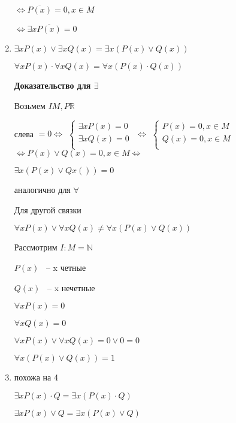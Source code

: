 \documentclass[russian]{lecture-notes}
\begin{document}
\begin{enumerate}
{	$\Leftrightarrow \overline{P(x)} = 0, x \in M$
	
	$\Leftrightarrow \exists x \overline{P(x)} = 0$
}

\item{
	$\exists x P(x) \lor \exists x Q(x) = \exists x (P(x) \lor Q(x))$
	
	$\forall x P(x) \cdot \forall x Q(x) = \forall x (P(x) \cdot Q(x))$
	
	\textbf{Доказательство для $\exists$}
	
	Возьмем $I M, P \mathbb{R}$
	
		
	
	слева $ = 0 \Leftrightarrow$
	$\left \{ 
  		\begin{gathered} 
    			\exists x P(x) = 0 \\          
        		\exists x Q(x) = 0 \\ 
	  	\end{gathered} 
	\right.$
	$\Leftrightarrow$
	$\left \{ 
  		\begin{gathered} 
    			P(x) = 0, x \in M \\          
        		Q(x) = 0, x \in M \\ 
	  	\end{gathered} 
	\right.$
	$\Leftrightarrow P(x) \lor Q(x) = 0, x \in M \Leftrightarrow$
	
	$\exists x (P(x) \lor Qx()) = 0$
	
	аналогично для $\forall$
	
	\begin{remark}
		Для другой связки
		
		$\forall x P(x) \lor \forall x Q(x) \neq \forall x (P(x) \lor Q(x))$ 
		
		Рассмотрим $I: M = \mathbb{N}$
		
		$P(x)$ ~-- x четные
		
		$Q(x)$ ~-- x нечетные
		
		$\forall x P(x) = 0$
		
		$\forall x Q(x) = 0$
		
		$\forall x P(x) \lor \forall x Q(x) = 0 \lor 0 = 0$
		
		$\forall x (P(x) \lor Q(x)) = 1$
	\end{remark}

}

\item{
	похожа на 4
	
	$\exists x P(x) \cdot Q = \exists x (P(x) \cdot Q)$
	
	$\exists x P(x) \lor Q = \exists x (P(x) \lor Q)$
	
}
\end{enumerate}
\end{document}
